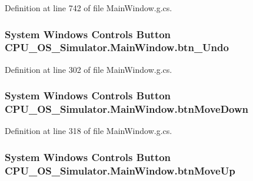 Definition at line 742 of file Main\+Window.\+g.\+cs.

\hypertarget{class_c_p_u___o_s___simulator_1_1_main_window_ac30720a1b345a3d59312d2d68f742359}{}
\subsubsection[{btn\+\_\+\+Undo}]{\setlength{\rightskip}{0pt plus 5cm}System Windows Controls Button C\+P\+U\+\_\+\+O\+S\+\_\+\+Simulator.\+Main\+Window.\+btn\+\_\+\+Undo\hspace{0.3cm}{\ttfamily [package]}}\label{class_c_p_u___o_s___simulator_1_1_main_window_ac30720a1b345a3d59312d2d68f742359}


Definition at line 302 of file Main\+Window.\+g.\+cs.

\hypertarget{class_c_p_u___o_s___simulator_1_1_main_window_ac6bfabebf21c92a905764305b789df46}{}
\subsubsection[{btn\+Move\+Down}]{\setlength{\rightskip}{0pt plus 5cm}System Windows Controls Button C\+P\+U\+\_\+\+O\+S\+\_\+\+Simulator.\+Main\+Window.\+btn\+Move\+Down\hspace{0.3cm}{\ttfamily [package]}}\label{class_c_p_u___o_s___simulator_1_1_main_window_ac6bfabebf21c92a905764305b789df46}


Definition at line 318 of file Main\+Window.\+g.\+cs.

\hypertarget{class_c_p_u___o_s___simulator_1_1_main_window_aa85d9301fed773f44a352aad64a9d80d}{}
\subsubsection[{btn\+Move\+Up}]{\setlength{\rightskip}{0pt plus 5cm}System Windows Controls Button C\+P\+U\+\_\+\+O\+S\+\_\+\+Simulator.\+Main\+Window.\+btn\+Move\+Up\hspace{0.3cm}{\ttfamily [package]}}\label{class_c_p_u___o_s___simulator_1_1_main_window_aa85d9301fed773f44a352aad64a9d80d}


